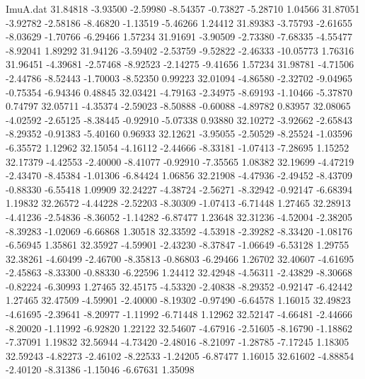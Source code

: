 \begin{filecontents}{ImuA.dat}
  31.84818   -3.93500   -2.59980   -8.54357   -0.73827   -5.28710    1.04566
  31.87051   -3.92782   -2.58186   -8.46820   -1.13519   -5.46266    1.24412
  31.89383   -3.75793   -2.61655   -8.03629   -1.70766   -6.29466    1.57234
  31.91691   -3.90509   -2.73380   -7.68335   -4.55477   -8.92041    1.89292
  31.94126   -3.59402   -2.53759   -9.52822   -2.46333  -10.05773    1.76316
  31.96451   -4.39681   -2.57468   -8.92523   -2.14275   -9.41656    1.57234
  31.98781   -4.71506   -2.44786   -8.52443   -1.70003   -8.52350    0.99223
  32.01094   -4.86580   -2.32702   -9.04965   -0.75354   -6.94346    0.48845
  32.03421   -4.79163   -2.34975   -8.69193   -1.10466   -5.37870    0.74797
  32.05711   -4.35374   -2.59023   -8.50888   -0.60088   -4.89782    0.83957
  32.08065   -4.02592   -2.65125   -8.38445   -0.92910   -5.07338    0.93880
  32.10272   -3.92662   -2.65843   -8.29352   -0.91383   -5.40160    0.96933
  32.12621   -3.95055   -2.50529   -8.25524   -1.03596   -6.35572    1.12962
  32.15054   -4.16112   -2.44666   -8.33181   -1.07413   -7.28695    1.15252
  32.17379   -4.42553   -2.40000   -8.41077   -0.92910   -7.35565    1.08382
  32.19699   -4.47219   -2.43470   -8.45384   -1.01306   -6.84424    1.06856
  32.21908   -4.47936   -2.49452   -8.43709   -0.88330   -6.55418    1.09909
  32.24227   -4.38724   -2.56271   -8.32942   -0.92147   -6.68394    1.19832
  32.26572   -4.44228   -2.52203   -8.30309   -1.07413   -6.71448    1.27465
  32.28913   -4.41236   -2.54836   -8.36052   -1.14282   -6.87477    1.23648
  32.31236   -4.52004   -2.38205   -8.39283   -1.02069   -6.66868    1.30518
  32.33592   -4.53918   -2.39282   -8.33420   -1.08176   -6.56945    1.35861
  32.35927   -4.59901   -2.43230   -8.37847   -1.06649   -6.53128    1.29755
  32.38261   -4.60499   -2.46700   -8.35813   -0.86803   -6.29466    1.26702
  32.40607   -4.61695   -2.45863   -8.33300   -0.88330   -6.22596    1.24412
  32.42948   -4.56311   -2.43829   -8.30668   -0.82224   -6.30993    1.27465
  32.45175   -4.53320   -2.40838   -8.29352   -0.92147   -6.42442    1.27465
  32.47509   -4.59901   -2.40000   -8.19302   -0.97490   -6.64578    1.16015
  32.49823   -4.61695   -2.39641   -8.20977   -1.11992   -6.71448    1.12962
  32.52147   -4.66481   -2.44666   -8.20020   -1.11992   -6.92820    1.22122
  32.54607   -4.67916   -2.51605   -8.16790   -1.18862   -7.37091    1.19832
  32.56944   -4.73420   -2.48016   -8.21097   -1.28785   -7.17245    1.18305
  32.59243   -4.82273   -2.46102   -8.22533   -1.24205   -6.87477    1.16015
  32.61602   -4.88854   -2.40120   -8.31386   -1.15046   -6.67631    1.35098

\end{filecontents}
